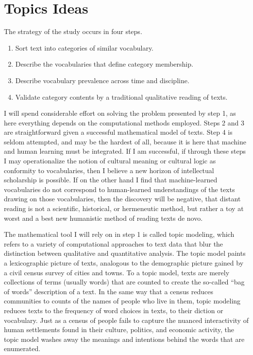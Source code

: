 \documentclass[]{book}
\providecommand{\tightlist}{%
  \setlength{\itemsep}{0pt}\setlength{\parskip}{0pt}}
\theoremstyle{definition}
\theoremstyle{definition}
\theoremstyle{definition}
\theoremstyle{remark}
\begin{document}
\hypertarget{topics-ideas}{%
\section{\texorpdfstring{Topics 
Ideas}{Topics  Ideas}}\label{topics-ideas}}

The strategy of the study occurs in four steps.

\begin{enumerate}
\def\labelenumi{\arabic{enumi}.}
\tightlist
\item
  Sort text into categories of similar vocabulary.
\item
  Describe the vocabularies that define category membership.
\item
  Describe vocabulary prevalence across time and discipline.
\item
  Validate category contents by a traditional qualitative reading of
  texts.
\end{enumerate}

I will spend considerable effort on solving the problem presented by
step 1, as here everything depends on the computational methods
employed. Steps 2 and 3 are straightforward given a successful
mathematical model of texts. Step 4 is seldom attempted, and may be the
hardest of all, because it is here that machine and human learning must
be integrated. If I am successful, if through these steps I may
operationalize the notion of cultural meaning or cultural logic as
conformity to vocabularies, then I believe a new horizon of intellectual
scholarship is possible. If on the other hand I find that
machine-learned vocabularies do not correspond to human-learned
understandings of the texts drawing on those vocabularies, then the
discovery will be negative, that distant reading is not a scientific,
historical, or hermeneutic method, but rather a toy at worst and a best
new humanistic method of reading texts de novo.

The mathematical tool I will rely on in step 1 is called topic modeling,
which refers to a variety of computational approaches to text data that
blur the distinction between qualitative and quantitative analysis. The
topic model paints a lexicographic picture of texts, analogous to the
demographic picture gained by a civil census survey of cities and towns.
To a topic model, texts are merely collections of terms (usually words)
that are counted to create the so-called ``bag of words'' description of
a text. In the same way that a census reduces communities to counts of
the names of people who live in them, topic modeling reduces texts to
the frequency of word choices in texts, to their diction or vocabulary.
Just as a census of people fails to capture the nuanced interactivity of
human settlements found in their culture, politics, and economic
activity, the topic model washes away the meanings and intentions behind
the words that are enumerated.
\end{document}
